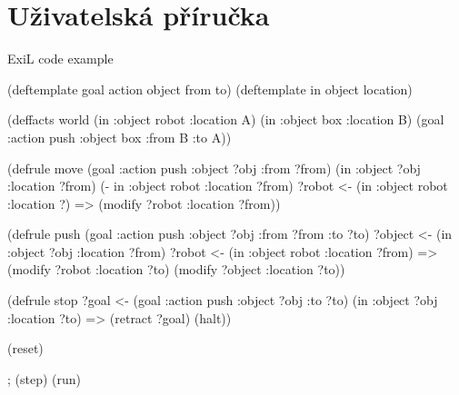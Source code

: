 \section{Uživatelská příručka}

\begin{listing}[H] %
\caption{ExiL code example}
\label{example}
\begin{clcode}
(deftemplate goal action object from to)
(deftemplate in object location)

(deffacts world
  (in :object robot :location A)
  (in :object box :location B)
  (goal :action push :object box :from B :to A))

(defrule move
  (goal :action push :object ?obj :from ?from)
  (in :object ?obj :location ?from)
  (- in :object robot :location ?from)
  ?robot <- (in :object robot :location ?)
  =>
  (modify ?robot :location ?from))

(defrule push
  (goal :action push :object ?obj :from ?from :to ?to)
  ?object <- (in :object ?obj :location ?from)
  ?robot <- (in :object robot :location ?from)
  =>
  (modify ?robot :location ?to)
  (modify ?object :location ?to))

(defrule stop
  ?goal <- (goal :action push :object ?obj :to ?to)
  (in :object ?obj :location ?to)
  =>
  (retract ?goal)
  (halt))

(reset)

; (step)
(run)
\end{clcode}
\end{listing}
